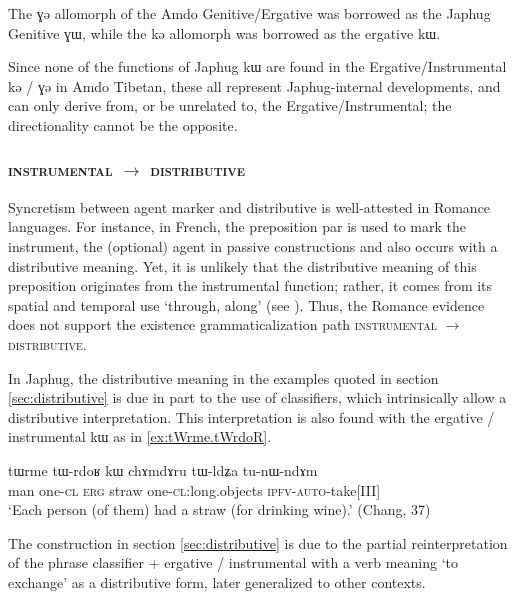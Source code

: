 \documentclass[oldfontcommands,oneside,a4paper,11pt]{article}
\newcommand{\ipa}[1]{{\phon #1}} %
\begin{document}
The \ipa{ɣə} allomorph of the Amdo Genitive/Ergative was borrowed as the Japhug Genitive \ipa{ɣɯ}, while the \ipa{kə} allomorph was borrowed  as the ergative \ipa{kɯ}. 

Since none of the functions of Japhug \ipa{kɯ} are found in the Ergative/Instrumental \ipa{kə} / \ipa{ɣə} in Amdo Tibetan, these all represent Japhug-internal developments, and can only derive from, or be unrelated to, the Ergative/Instrumental; the directionality cannot be the opposite.



 \subsubsection{\textsc{instrumental} $\rightarrow$ \textsc{distributive} }
  
Syncretism between agent marker and distributive is well-attested in Romance languages. For instance, in French, the preposition  \ipa{par}  is used to mark the instrument, the (optional) agent in passive constructions and also occurs with a distributive meaning. Yet, it is unlikely that the distributive meaning of this preposition originates from the instrumental function; rather, it comes from its  spatial and temporal use `through, along' (see \citealt[213]{wartburg58few8}). 
Thus, the Romance evidence does not support the existence grammaticalization path \textsc{instrumental} $\rightarrow$ \textsc{distributive}.

In Japhug, the distributive meaning in the examples quoted in section \ref{sec:distributive} is due in part to the use of classifiers, which intrinsically allow a distributive interpretation. This interpretation is also found with the ergative / instrumental \ipa{kɯ} as in \ref{ex:tWrme.tWrdoR}.
\begin{exe}
\ex \label{ex:tWrme.tWrdoR}
\gll 
\ipa{tɯrme}  	\ipa{tɯ-rdoʁ}  	\ipa{kɯ}  	\ipa{chɤmdɤru}  	\ipa{tɯ-ldʑa}  	\ipa{tu-nɯ-ndɤm}  \\
man one-\textsc{cl} \textsc{erg}  straw one-\textsc{cl}:long.objects \textsc{ipfv-auto}-take[III] \\
\glt `Each person (of them) had a straw (for drinking wine).' (Chang, 37)
\end{exe}
 
 The construction in section \ref{sec:distributive} is due to the partial reinterpretation of the phrase classifier + ergative / instrumental with a verb meaning `to exchange' as a distributive form, later generalized to other contexts.%
 
\end{document}
